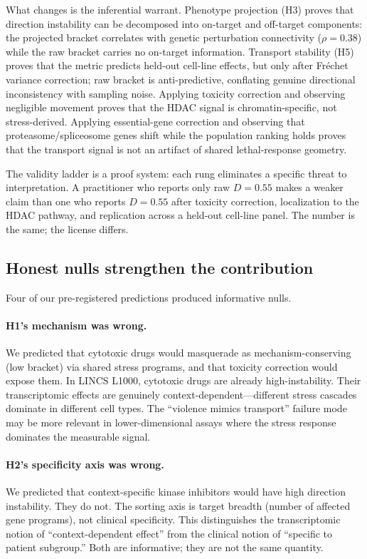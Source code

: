 \documentclass{article}
\begin{document}
What changes is the inferential warrant. Phenotype projection (H3) proves
that direction instability can be decomposed into on-target and off-target
components: the projected bracket correlates with genetic perturbation
connectivity ($\rho = 0.38$) while the raw bracket carries no on-target
information. Transport stability (H5) proves that the metric predicts
held-out cell-line effects, but only after Fr\'{e}chet variance correction;
raw bracket is anti-predictive, conflating genuine directional inconsistency
with sampling noise. Applying toxicity correction and
observing negligible movement proves that the HDAC signal is
chromatin-specific, not stress-derived. Applying essential-gene correction
and observing that proteasome/spliceosome genes shift while the population
ranking holds proves that the transport signal is not an artifact of shared
lethal-response geometry.

The validity ladder is a proof system: each rung eliminates a specific threat
to interpretation. A practitioner who reports only raw $D = 0.55$ makes a
weaker claim than one who reports $D = 0.55$ after toxicity correction,
localization to the HDAC pathway, and replication across a held-out cell-line
panel. The number is the same; the license differs.

\subsection{Honest nulls strengthen the contribution}

Four of our pre-registered predictions produced informative nulls.

\paragraph{H1's mechanism was wrong.}
We predicted that cytotoxic drugs would masquerade as mechanism-conserving
(low bracket) via shared stress programs, and that toxicity correction would
expose them. In LINCS L1000, cytotoxic drugs are already high-instability.
Their transcriptomic effects are genuinely context-dependent---different stress
cascades dominate in different cell types. The ``violence mimics transport''
failure mode may be more relevant in lower-dimensional assays where the stress
response dominates the measurable signal.

\paragraph{H2's specificity axis was wrong.}
We predicted that context-specific kinase inhibitors would have high direction
instability. They do not. The sorting axis is target breadth (number of
affected gene programs), not clinical specificity. This distinguishes the
transcriptomic notion of ``context-dependent effect'' from the clinical notion
of ``specific to patient subgroup.'' Both are informative; they are not the
same quantity.
\end{document}
